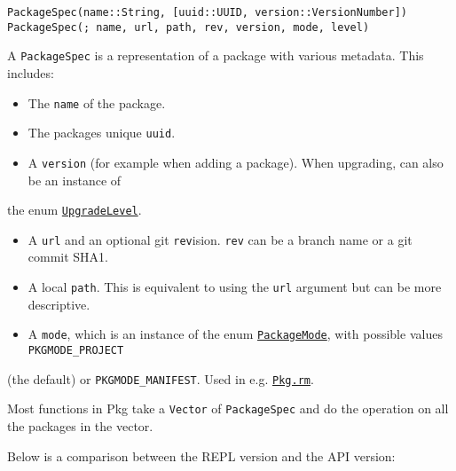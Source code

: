 \begin{adjustwidth}{2em}{0pt}


\begin{verbatim}
PackageSpec(name::String, [uuid::UUID, version::VersionNumber])
PackageSpec(; name, url, path, rev, version, mode, level)
\end{verbatim}

A \texttt{PackageSpec} is a representation of a package with various metadata. This includes:

\begin{itemize}
\item The \texttt{name} of the package.


\item The package{\textquotesingle}s unique \texttt{uuid}.


\item A \texttt{version} (for example when adding a package). When upgrading, can also be an instance of

\end{itemize}
the enum \hyperlink{13785530562686832335}{\texttt{UpgradeLevel}}.

\begin{itemize}
\item A \texttt{url} and an optional git \texttt{rev}ision. \texttt{rev} can be a branch name or a git commit SHA1.


\item A local \texttt{path}. This is equivalent to using the \texttt{url} argument but can be more descriptive.


\item A \texttt{mode}, which is an instance of the enum \hyperlink{3271836720350904911}{\texttt{PackageMode}}, with possible values \texttt{PKGMODE\_PROJECT}

\end{itemize}
(the default) or \texttt{PKGMODE\_MANIFEST}. Used in e.g. \hyperlink{4147981366221469810}{\texttt{Pkg.rm}}.

Most functions in Pkg take a \texttt{Vector} of \texttt{PackageSpec} and do the operation on all the packages in the vector.

Below is a comparison between the REPL version and the API version:


\begin{table}[h]


\end{table}
\end{adjustwidth}
